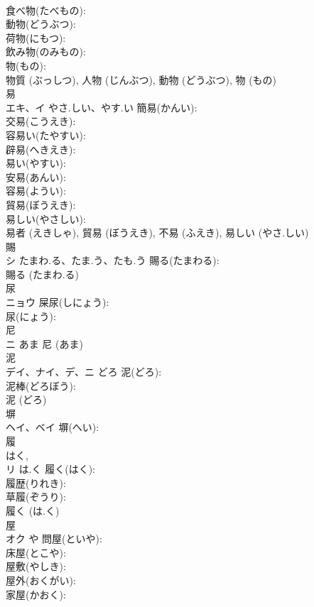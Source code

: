 \documentclass[8pt]{extreport}
\begin{document}
\begin{CJK}{UTF8}{min}
\\	食べ物(たべもの): 
\\	動物(どうぶつ): 
\\	荷物(にもつ): 
\\	飲み物(のみもの): 
\\	物(もの): 
\\	物質 (ぶっしつ), 人物 (じんぶつ), 動物 (どうぶつ), 物 (もの)
\\	易			
\\	エキ、イ	やさ.しい、やす.い	簡易(かんい): 
\\	交易(こうえき): 
\\	容易い(たやすい): 
\\	辟易(へきえき): 
\\	易い(やすい): 
\\	安易(あんい): 
\\	容易(ようい): 
\\	貿易(ぼうえき): 
\\	易しい(やさしい): 
\\	易者 (えきしゃ), 貿易 (ぼうえき), 不易 (ふえき), 易しい (やさ.しい)
\\	賜			
\\	シ	たまわ.る、たま.う、たも.う	賜る(たまわる): 
\\	賜る (たまわ.る)
\\	尿			
\\	ニョウ		屎尿(しにょう): 
\\	尿(にょう): 
\\	尼			
\\	ニ	あま		尼 (あま)
\\	泥			
\\	デイ、ナイ、デ、ニ	どろ	泥(どろ): 
\\	泥棒(どろぼう): 
\\	泥 (どろ)
\\	塀			
\\	ヘイ、ベイ		塀(へい): 
\\	履			
\\	はく, 
\\	リ	は.く	履く(はく): 
\\	履歴(りれき): 
\\	草履(ぞうり): 
\\	履く (は.く)
\\	屋			
\\	オク	や	問屋(といや): 
\\	床屋(とこや): 
\\	屋敷(やしき): 
\\	屋外(おくがい): 
\\	家屋(かおく): 

\end{CJK}
\end{document}
